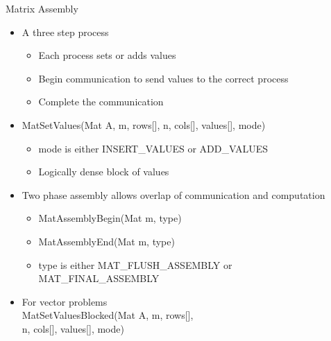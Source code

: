 \begin{frame}{Matrix Assembly}

\begin{itemize}
  \item A three step process
  \begin{itemize}
    \item Each process sets or adds values
    \item Begin communication to send values to the correct process
    \item Complete the communication
  \end{itemize}

  \item {\kb MatSetValues(Mat A, m, rows[], n, cols[], values[], mode)}
  \begin{itemize}
    \item {\kb mode} is either INSERT\_VALUES or ADD\_VALUES
    \item Logically dense block of values
  \end{itemize}

  \item Two phase assembly allows overlap of communication and computation
  \begin{itemize}
    \item {\kb MatAssemblyBegin(Mat m, type)}
    \item {\kb MatAssemblyEnd(Mat m, type)}
    \item {\kb type} is either MAT\_FLUSH\_ASSEMBLY or MAT\_FINAL\_ASSEMBLY
  \end{itemize}

  \item<2-> For vector problems\\
    {\kb MatSetValuesBlocked(Mat A, m, rows[], \\
      \qquad\qquad n, cols[], values[], mode)}
\end{itemize}

\end{frame}
